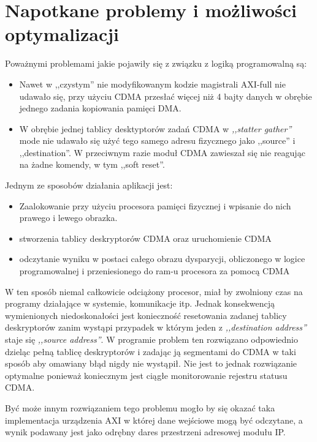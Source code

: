 \section{Napotkane problemy i możliwości optymalizacji}
\label{sec:logika:optymalizacja}


Poważnymi problemami jakie pojawiły się z związku z logiką programowalną są:

\begin{itemize}
\item Nawet w ,,czystym'' nie modyfikowanym kodzie magistrali AXI-full
    nie udawało się, przy użyciu CDMA przesłać więcej niż 4 bajty danych w obrębie
    jednego zadania kopiowania pamięci DMA.
\item W obrębie jednej tablicy desktyptorów zadań CDMA w \textit{,,statter gather''}
    mode nie udawało się użyć tego samego adresu fizycznego jako ,,source'' i ,,destination''.
    W przeciwnym razie moduł CDMA zawieszał się nie reagując na żadne komendy, w tym
    ,,soft reset''.
\end{itemize}

Jednym ze sposobów działania aplikacji jest:
\begin{itemize}
\item Zaalokowanie przy użyciu procesora pamięci fizycznej i wpisanie do nich
    prawego i lewego obrazka.
\item stworzenia tablicy deskryptorów CDMA oraz uruchomienie CDMA
\item odczytanie wyniku w postaci całego obrazu dysparycji, obliczonego w logice programowalnej i
    przeniesionego do ram-u procesora za pomocą CDMA
\end{itemize}

W ten sposób niemal całkowicie odciążony procesor, miał by zwolniony czas
na programy działające w systemie, komunikacje itp. Jednak konsekwencją wymienionych niedoskonałości
jest konieczność resetowania zadanej tablicy deskryptorów zanim wystąpi przypadek
w którym jeden z \textit{,,destination address''} staje się \textit{,,source address''}.
W programie problem ten rozwiązano odpowiednio dzieląc pełną tablicę deskryptorów
i zadając ją segmentami do CDMA w taki sposób aby omawiany błąd nigdy nie wystąpił.
Nie jest to jednak rozwiązanie optymalne ponieważ koniecznym jest ciągłe monitorowanie
rejestru statusu CDMA.

Być może innym rozwiązaniem tego problemu mogło by się okazać taka implementacja
urządzenia AXI w której dane wejściowe mogą być odczytane, a wynik podawany jest jako
odrębny dares przestrzeni adresowej modułu IP.

